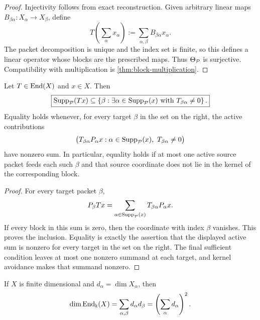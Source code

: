 \begin{proof}
Injectivity follows from exact reconstruction.  Given arbitrary linear maps $B_{\beta\alpha}:X_\alpha\to X_\beta$, define
\[
T\left(\sum_\alpha x_\alpha\right)
:=
\sum_{\alpha,\beta}B_{\beta\alpha}x_\alpha.
\]
The packet decomposition is unique and the index set is finite, so this defines a linear operator whose blocks are the prescribed maps.  Thus $\Theta_{\mathcal P}$ is surjective.  Compatibility with multiplication is \cref{thm:block-multiplication}.
\end{proof}



\begin{corollary}
\label{cor:packet-support-propagation}
Let \(T\in\operatorname{End}(X)\) and \(x\in X\).  Then
\[
\boxed{
\operatorname{Supp}_{\mathcal P}(Tx)
\subseteq
\left\{\beta:\exists\alpha\in\operatorname{Supp}_{\mathcal P}(x)
\text{ with }T_{\beta\alpha}\neq0\right\}.
}
\]
Equality holds whenever, for every target \(\beta\) in the set on the right, the active contributions
\[
\bigl(T_{\beta\alpha}P_\alpha x:
\alpha\in\operatorname{Supp}_{\mathcal P}(x),\ T_{\beta\alpha}\neq0\bigr)
\]
have nonzero sum.  In particular, equality holds if at most one active source packet feeds each such \(\beta\) and that source coordinate does not lie in the kernel of the corresponding block.
\end{corollary}

\begin{proof}
For every target packet \(\beta\),
\[
P_\beta Tx
=
\sum_{\alpha\in\operatorname{Supp}_{\mathcal P}(x)}T_{\beta\alpha}P_\alpha x.
\]
If every block in this sum is zero, then the coordinate with index \(\beta\) vanishes.  This proves the inclusion.  Equality is exactly the assertion that the displayed active sum is nonzero for every target in the set on the right.  The final sufficient condition leaves at most one nonzero summand at each target, and kernel avoidance makes that summand nonzero.
\end{proof}


\begin{corollary}
\label{cor:dimension-count}
If $X$ is finite dimensional and $d_\alpha=\dim X_\alpha$, then
\[
\dim\operatorname{End}_{\Bbbk}(X)
=
\sum_{\alpha,\beta}d_\alpha d_\beta
=
\left(\sum_\alpha d_\alpha\right)^2.
\]
\end{corollary}

